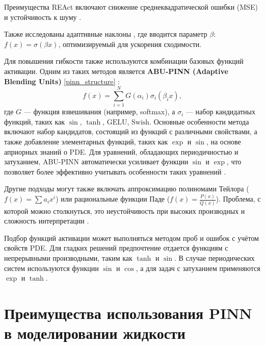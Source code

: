 Преимущества REAct включают снижение среднеквадратической ошибки (MSE) и устойчивость к шуму
\cite{0d752c79fb816703274a3d37f85a85689a2a9405}.

Также исследованы адаптивные наклоны \cite{7fcd4b3c875d8e41eb0c184aa1a42bf4c8906d61}, где вводится параметр
$\beta$: $f(x) = \sigma(\beta x)$, оптимизируемый для ускорения сходимости.

Для повышения гибкости также используются комбинации базовых функций активации. Одним из таких методов является
\textbf{ABU-PINN (Adaptive Blending Units)} \ref{pinn_structure} \cite{Sutfeld2018-io}\cite{7fcd4b3c875d8e41eb0c184aa1a42bf4c8906d61}:
\begin{equation}
f(x) = \sum_{i=1}^N G(\alpha_i) \sigma_i(\beta_i x),
\end{equation}
где $G$ — функция взвешивания (например, softmax), а $\sigma_i$ — набор кандидатных функций, таких как
$\sin$, $\tanh$, $\mathrm{GELU}$, $\mathrm{Swish}$. 
Основные особенности метода включают набор кандидатов, состоящий из функций с различными свойствами, а
также добавление элементарных функций, таких как $\exp$ и $\sin$, на основе априорных знаний о PDE.
Для уравнений, обладающих периодичностью и затуханием, ABU-PINN автоматически усиливает функции
$\sin$ и $\exp$, что позволяет более эффективно учитывать особенности таких уравнений
\cite{7fcd4b3c875d8e41eb0c184aa1a42bf4c8906d61}.



Другие подходы могут также включать аппроксимацию полиномами Тейлора ($f(x) = \sum a_i x^i$) или
рациональные функции Паде ($f(x) = \frac{P(x)}{Q(x)}$).
Проблема, с которой можно столкнуться, это неустойчивость при высоких производных и сложность
интерпретации \cite{7fcd4b3c875d8e41eb0c184aa1a42bf4c8906d61}.

Подбор функций активации может выполняться методом проб и ошибок с учётом свойств PDE. Для гладких решений
предпочтение отдается функциям с непрерывными производными, таким как $\tanh$ и $\sin$. В случае периодических
систем используются функции $\sin$ и $\cos$, а для задач с затуханием применяются $\exp$ и $\tanh$.


\section{Преимущества использования PINN в моделировании жидкости}
